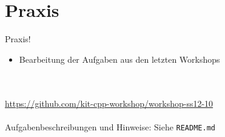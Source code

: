\section{Praxis}
\begin{frame}[fragile]{Praxis!}
	\begin{itemize}
		\item Bearbeitung der Aufgaben aus den letzten Workshops
	\end{itemize}
	\ \\
	\ \\
	\large{\url{https://github.com/kit-cpp-workshop/workshop-ss12-10}} \\
	\ \\
	Aufgabenbeschreibungen und Hinweise: Siehe \verb|README.md|

\end{frame}
